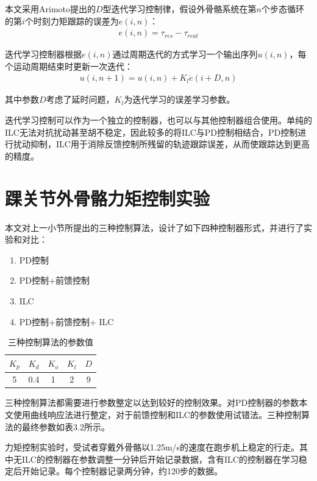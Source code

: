 本文采用Arimoto\cite{p47}提出的$D$型迭代学习控制律，假设外骨骼系统在第$n$个步态循环的第$i$个时刻力矩跟踪的误差为$e(i,n)$：
\begin{align}
    e(i,n) = \tau_{res} - \tau_{real}
\end{align}

迭代学习控制器根据$e(i,n)$通过周期迭代的方式学习一个输出序列$u(i,n)$，每个运动周期结束时更新一次迭代：
\begin{align}
    u(i,n+1) = u(i,n) + K_l\dot{e}(i+D,n)
\end{align}

其中参数$D$考虑了延时问题，$K_l$为迭代学习的误差学习参数。

迭代学习控制可以作为一个独立的控制器，也可以与其他控制器组合使用。单纯的ILC无法对抗扰动甚至胡不稳定，因此较多的将ILC与PD控制相结合，PD控制进行扰动抑制，ILC用于消除反馈控制所残留的轨迹跟踪误差，从而使跟踪达到更高的精度。

\section{踝关节外骨骼力矩控制实验}

本文对上一小节所提出的三种控制算法，设计了如下四种控制器形式，并进行了实验和对比：
\begin{enumerate}
    \item PD控制
    \item PD控制+前馈控制
    \item ILC
    \item PD控制+前馈控制+ ILC
\end{enumerate}

\begin{table}[htb]
    \caption[控制参数]{三种控制算法的参数值}
    \begin{tabular}{ccccc}
      \toprule
        $K_p$ & $K_d$ & $K_o$ & $K_l$ & $D$ \\
      \midrule
        5 & 0.4 & 1 & 2 & 9 \\
      \bottomrule
    \end{tabular}
\end{table}


三种控制算法都需要进行参数整定以达到较好的控制效果。对PD控制器的参数本文使用曲线响应法进行整定，对于前馈控制和ILC的参数使用试错法。三种控制算法的最终参数如表3.2所示。

力矩控制实验时，受试者穿戴外骨骼以1.25m/s的速度在跑步机上稳定的行走。其中无ILC的控制器在参数调整一分钟后开始记录数据，含有ILC的控制器在学习稳定后开始记录。每个控制器记录两分钟，约120步的数据。

